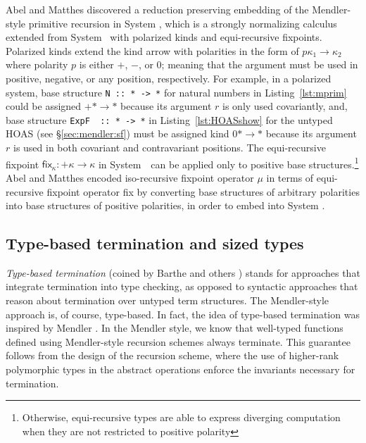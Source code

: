 Abel and Matthes \cite{AbeMat04} discovered a reduction preserving
embedding of the Mendler-style primitive recursion in System \Fixw,
which is a strongly normalizing calculus extended from System \Fw\ with
polarized kinds and equi-recursive fixpoints. Polarized kinds extend
the kind arrow with polarities in the form of $p\kappa_1 \to \kappa_2$
where polarity $p$ is either $+$, $-$, or $0$; meaning that the argument
must be used in positive, negative, or any position, respectively.
For example, in a polarized system, base structure \lstinline{N :: * -> *} 
for natural numbers in Listing~\ref{lst:mprim} could be assigned $+*\to*$
because its argument $r$ is only used covariantly, and, base structure
\lstinline{ExpF  :: * -> *} in Listing~\ref{lst:HOASshow} for the untyped HOAS
(see \S\ref{sec:mendler:sf}) must be assigned kind $0* \to *$ because
its argument $r$ is used in both covariant and contravariant positions.
The equi-recursive fixpoint $\textsf{fix}_\kappa : +\kappa \to \kappa$
in System~\Fixw\ can be applied only to positive base structures.\footnote{
	Otherwise, equi-recursive types are able to express
	diverging computation when they are not restricted to positive polarity}
Abel and Matthes encoded iso-recursive fixpoint operator $\mu$ in terms of
equi-recursive fixpoint operator \textsf{fix} by converting base structures of
arbitrary polarities into base structures of positive polarities, in order
to embed \mpr{} into System \Fixw.

\subsection{Type-based termination and sized types}\label{sec:relwork:sized}
\emph{Type-based termination} (coined by Barthe and others \cite{BartheFGPU04})
stands for approaches that integrate termination into type checking,
as opposed to syntactic approaches that reason about termination over
untyped term structures. The Mendler-style approach is, of course,
type-based. In fact, the idea of type-based termination was inspired by
Mendler \cite{Mendler87,Mendler91}. In the Mendler style, we know that
well-typed functions defined using Mendler-style recursion schemes always
terminate. This guarantee follows from the design of the recursion scheme,
where the use of higher-rank polymorphic types in the abstract operations
enforce the invariants necessary for termination.

